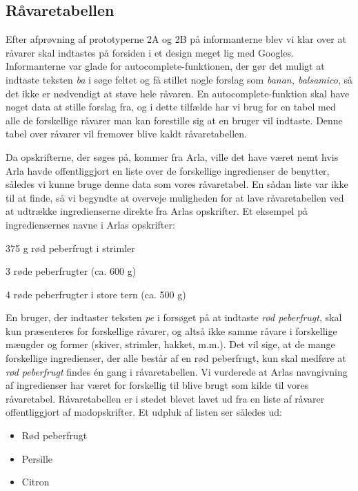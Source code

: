 \subsection{Råvaretabellen}
Efter afprøvning af prototyperne 2A og 2B på informanterne blev vi klar over at råvarer skal indtastes på forsiden i et design meget lig med Googles. Informanterne var glade for autocomplete-funktionen, der gør det muligt at indtaste teksten \textit{ba} i søge feltet og få stillet nogle forslag som \fx \textit{banan, balsamico}, så det ikke er nødvendigt at stave hele råvaren.
En autocomplete-funktion skal have noget data at stille forslag fra, og i dette tilfælde har vi brug for en tabel med alle de forskellige råvarer man kan forestille sig at en bruger vil indtaste. Denne tabel over råvarer vil fremover blive kaldt råvaretabellen.

Da opskrifterne, der søges på, kommer fra Arla, ville det have været nemt hvis Arla havde offentliggjort en liste over de forskellige ingredienser de benytter, således vi kunne bruge denne data som vores råvaretabel. En sådan liste var ikke til at finde, så vi begyndte at overveje muligheden for at lave råvaretabellen ved at udtrække ingredienserne direkte fra Arlas opskrifter. Et eksempel på ingrediensernes navne i Arlas opskrifter:

375 g rød peberfrugt i strimler

3 røde peberfrugter (ca. 600 g)

4 røde peberfrugter i store tern (ca. 500 g)

En bruger, der indtaster teksten \textit{pe} i forsøget på at indtaste \textit{rød peberfrugt}, skal kun præsenteres for forskellige råvarer, og altså ikke samme råvare i forskellige mængder og former (skiver, strimler, hakket, m.m.). Det vil sige, at de mange forskellige ingredienser, der alle består af en rød peberfrugt, kun skal medføre at \textit{rød peberfrugt} findes én gang i råvaretabellen. Vi vurderede at Arlas navngivning af ingredienser har været for forskellig til blive brugt som kilde til vores råvaretabel. Råvaretabellen er i stedet blevet lavet ud fra en liste af råvarer offentliggjort af madopskrifter. Et udpluk af listen ser således ud:

\begin{itemize}
\item Rød peberfrugt
\item Persille
\item Citron
\end{itemize}


